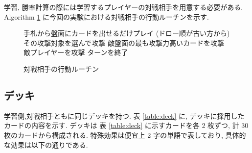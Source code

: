 \documentclass[twocolumn]{jarticle}
\begin{document}
学習, 勝率計算の際には学習するプレイヤーの対戦相手を用意する必要がある.
Algorithm \ref{alg1} に今回の実験における対戦相手の行動ルーチンを示す.
\begin{figure}[t]
  \vspace{-0.3cm}
  \begin{algorithm}[H]
    \small
      \caption{
        対戦相手の行動ルーチン
        }
      \label{alg1}
      \begin{algorithmic}[1] 
      \STATE 手札から盤面にカードを出せるだけプレイ (ドロー順が古い方から)
      \STATE その攻撃対象を選んで攻撃
      \ELSE
      \STATE 敵盤面の最も攻撃力高いカードを攻撃
      \ELSE
      \STATE 敵プレイヤーを攻撃
      \ENDIF
      \ENDIF
      \ENDFOR
      \STATE ターンを終了
      \end{algorithmic}
  \end{algorithm}
  \vspace{-0.3cm}
  \end{figure}


\subsection{デッキ}
学習側,対戦相手ともに同じデッキを持つ.
表 \ref{table:deck} に, デッキに採用したカードの内容を示す. デッキは 表 \ref{table:deck} に示すカードを各 2 枚ずつ, 計 30 枚のカードから構成される. 
特殊効果は便宜上 2 字の単語で表しており, 具体的な効果は以下の通りである.
\end{document}
